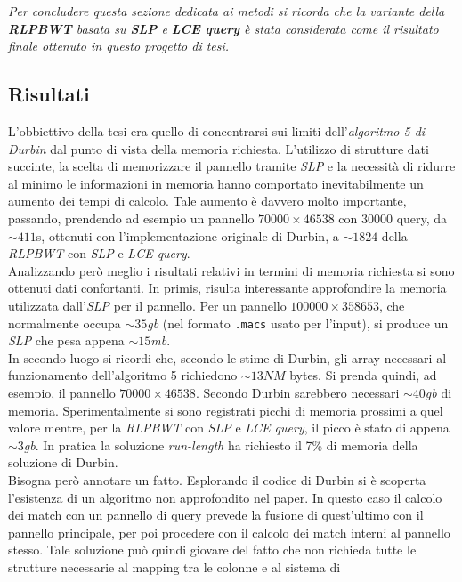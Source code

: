 \documentclass[a4paper,11pt, oneside]{article}
\begin{document}
\textit{Per concludere questa sezione dedicata ai metodi si ricorda che la
  variante 
della \textbf{RLPBWT} basata su \textbf{SLP} e \textbf{LCE query} è stata
considerata come il risultato finale ottenuto in questo progetto di tesi.}
\subsection*{Risultati}
L'obbiettivo della tesi era quello di concentrarsi sui limiti
dell'\textit{algoritmo 5 di Durbin} dal punto di vista della memoria
richiesta. L'utilizzo di strutture dati succinte, la scelta di memorizzare il
pannello tramite \textit{SLP} e la necessità di ridurre al minimo le
informazioni in memoria hanno comportato inevitabilmente un aumento dei tempi di
calcolo. Tale aumento è davvero molto importante, passando, prendendo ad esempio
un pannello $70000 \times 46538$ con $30000$ query, da $\sim 411$s, ottenuti con
l'implementazione originale di Durbin, a $\sim 1824$
della \textit{RLPBWT} con \textit{SLP} e \textit{LCE query}. \\
Analizzando però meglio i risultati relativi in termini di memoria richiesta si
sono ottenuti dati confortanti. In primis, risulta interessante approfondire la
memoria utilizzata dall'\textit{SLP} per il pannello. Per un pannello
$100000\times 358653$, che normalmente occupa $\sim 
35$\textit{gb} (nel formato \texttt{.macs} usato per l'input), si produce un
\textit{SLP} che pesa appena $\sim 15$\textit{mb}.\\
In secondo luogo si ricordi che, secondo le stime di Durbin, gli array necessari
al funzionamento dell'algoritmo 5 richiedono $\sim 13NM$ bytes. Si prenda
quindi, ad esempio, il pannello $70000 \times 46538$. Secondo Durbin sarebbero
necessari $\sim 40$\textit{gb} di memoria. Sperimentalmente si sono registrati
picchi di memoria prossimi a quel valore mentre, per la \textit{RLPBWT} con
\textit{SLP} e \textit{LCE query}, il picco è stato di appena $\sim
3$\textit{gb}. In pratica la soluzione \textit{run-length} ha richiesto il 7\%
di memoria della soluzione di Durbin.\\
Bisogna però annotare un fatto. Esplorando il codice di Durbin si è scoperta
l'esistenza di un algoritmo non approfondito nel paper. In questo caso il
calcolo dei match con un pannello di query prevede la fusione di quest'ultimo
con il pannello principale, per poi procedere con il calcolo dei match interni
al pannello stesso. Tale soluzione può quindi giovare del fatto che non richieda
tutte le strutture necessarie al mapping tra le colonne e al sistema di
\end{document}
